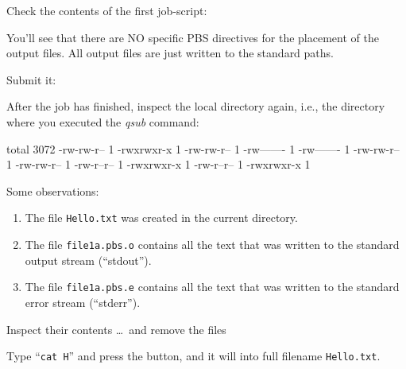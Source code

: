 Check the contents of the first job-script:


You'll see that there are NO specific PBS directives for the placement of the output files. All output files are
just written to the standard paths.

Submit it:

\begin{prompt}
\end{prompt}

After the job has finished, inspect the local directory again, i.e., the
directory where you executed the \emph{qsub} command:

\begin{prompt}
total 3072
-rw-rw-r-- 1 %
-rwxrwxr-x 1 %
-rw-rw-r-- 1 %
-rw------- 1 %
-rw------- 1 %
-rw-rw-r-- 1 %
-rw-rw-r-- 1 %
-rw-r--r-- 1 %
-rwxrwxr-x 1 %
-rw-r--r-- 1 %
-rwxrwxr-x 1 %
\end{prompt}

Some observations:
\begin{enumerate}
\item The file \texttt{Hello.txt} was created in the current directory.
\item The file \texttt{file1a.pbs.o\jobnumber} contains all the text that was written to the standard output stream (``stdout'').
\item The file \texttt{file1a.pbs.e\jobnumber} contains all the text that was written to the standard error stream (``stderr'').
\end{enumerate}

Inspect their contents \dots\ and remove the files

\begin{prompt}
\end{prompt}

\begin{tip}
Type ``\texttt{cat H}'' and press the  button, and it will
 into full filename \texttt{Hello.txt}.
\end{tip}

